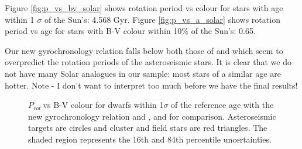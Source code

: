 \documentclass[12pt,preprint]{aastex}
\newcommand{\prot}{$P_{rot}~$}
\begin{document}
Figure \ref{fig:p_vs_bv_solar} shows rotation period vs colour for stars with age within 1 $\sigma$ of the Sun's: 4.568 Gyr.
Figure \ref{fig:p_vs_a_solar} shows rotation period vs age for stars with B-V colour within 10\% of the Sun's: 0.65.

Our new gyrochronology relation falls below both those of \citet{Barnes2007} and \citet{Mamajek2008} which seem to overpredict the rotation periods of the asteroseismic stars.
It is clear that we do not have many Solar analogues in our sample: most stars of a similar age are hotter.
{\color{red} Note - I don't want to interpret too much before we have the final results!}

\begin{figure}[ht]
\begin{center}
    \end{center}
    \caption{ \prot vs B-V colour for dwarfs within 1$\sigma$ of the reference age with the new gyrochronology relation and \citet{Barnes2007}, and \citet{Mamajek2008} for comparison. Asteroseismic targets are circles and cluster and field stars are red triangles. The shaded region represents the 16th and 84th percentile uncertainties.
     }
   \label{fig:subfigures2}
\end{figure}
\end{document}
